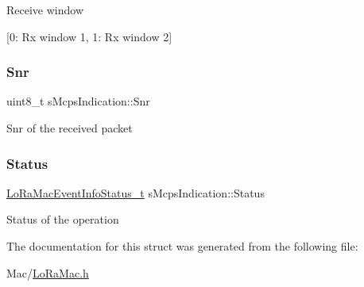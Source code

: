 Receive window

\mbox{[}0\+: Rx window 1, 1\+: Rx window 2\mbox{]} \mbox{\label{structsMcpsIndication_a408da739421acbaba81eab1836a432ed}} 
\subsubsection{\texorpdfstring{Snr}{Snr}}
{\footnotesize\ttfamily uint8\+\_\+t s\+Mcps\+Indication\+::\+Snr}

Snr of the received packet \mbox{\label{structsMcpsIndication_a8a63a10eb4bd7084254fa3b5a3387f3c}} 
\subsubsection{\texorpdfstring{Status}{Status}}
{\footnotesize\ttfamily \hyperlink{group__LORAMAC_gac6ffc346a4c767f7a743c87a686c51b4}{Lo\+Ra\+Mac\+Event\+Info\+Status\+\_\+t} s\+Mcps\+Indication\+::\+Status}

Status of the operation 

The documentation for this struct was generated from the following file\+:\begin{DoxyCompactItemize}
\item 
Mac/\hyperlink{LoRaMac_8h}{Lo\+Ra\+Mac.\+h}\end{DoxyCompactItemize}
